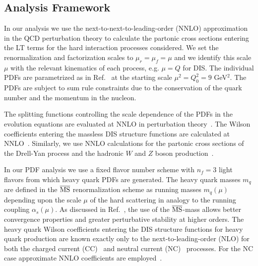\documentclass[%
      aps,
      prd,
      floatfix,
      preprintnumbers,
      preprint,
      showpacs,
      nofootinbib,
      tightenlines,
      amssymb,
      amsmath
]{revtex4-1}
\begin{document}
\subsection{Analysis Framework} 
\label{sec:framework} 

In our analysis we use the next-to-next-to-leading-order (NNLO) approximation in the QCD perturbation theory 
to calculate the partonic cross sections entering the LT terms for the hard interaction processes considered. 
We set the renormalization and factorization scales to $\mu_r=\mu_f=\mu$ and we identify this scale $\mu$ with the 
relevant kinematics of each process, e.g. $\mu = Q$ for DIS. 
The individual PDFs are parametrized as in Ref.~\cite{Alekhin:2017kpj} 
at the starting scale $\mu^2=Q^2_0=9$ GeV$^2$. The PDFs are subject to sum rule 
constraints due to the conservation of the quark number and the momentum in the nucleon. 

The splitting functions controlling the scale dependence of the PDFs in the evolution equations are 
evaluated at NNLO in perturbation theory~\cite{Moch:2004pa,Vogt:2004mw}. 
The Wilson coefficients entering the massless DIS structure functions are calculated at  
NNLO~\cite{vanNeerven:1991nn,Zijlstra:1991qc,Zijlstra:1992qd,Zijlstra:1992kj,Moch:1999eb,Moch:2004xu,Vermaseren:2005qc}.
Similarly, we use NNLO calculations for the partonic cross sections of the Drell-Yan process and the 
hadronic $W$ and $Z$ boson production~\cite{Hamberg:1990np,Harlander:2002wh,Anastasiou:2003yy,Anastasiou:2003ds,Catani:2009sm}.  

In our PDF analysis we use a fixed flavor number scheme with $n_f=3$ light flavors from which heavy quark PDFs 
are generated. The heavy quark masses $m_q$ are defined in the $\overline{\rm MS}$ renormalization scheme  
as running masses $m_q(\mu)$ depending upon the scale $\mu$ of the hard scattering in analogy to the running 
coupling $\alpha_s(\mu)$. 
As discussed in Ref.~\cite{Alekhin:2010sv}, the use of the $\overline{\rm MS}$-mass allows better 
convergence properties and greater perturbative stability at higher orders. 
The heavy quark Wilson coefficients entering the DIS structure functions for heavy quark production 
are known exactly only to the next-to-leading-order (NLO) for both the 
charged current (CC)~\cite{Gottschalk:1980rv,Gluck:1996ve} and neutral current (NC)~\cite{Laenen:1992zk} processes.   
For the NC case approximate NNLO coefficients are employed~\cite{Alekhin:2017kpj}. 
\end{document}
